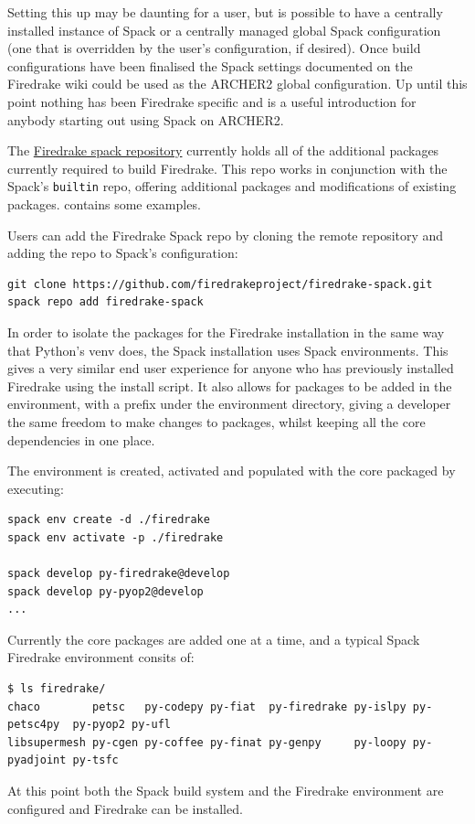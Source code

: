\documentclass[a4paper,11pt]{article}
\begin{document}
Setting this up may be daunting for a user, but is possible to have a centrally installed instance of Spack or a centrally managed global Spack configuration (one that is overridden by the user's configuration, if desired).
Once build configurations have been finalised the Spack settings documented on the Firedrake wiki\cite{firedrakewiki} could be used as the ARCHER2 global configuration.
Up until this point nothing has been Firedrake specific and is a useful introduction for anybody starting out using Spack on ARCHER2.

The \href{https://github.com/firedrakeproject/firedrake-spack}{Firedrake spack repository} currently holds all of the additional packages currently required to build Firedrake.
This repo works in conjunction with the Spack's \verb`builtin` repo, offering additional packages and modifications of existing packages.
 contains some examples.

Users can add the Firedrake Spack repo by cloning the remote repository and adding the repo to Spack's configuration:
\begin{lstlisting}
git clone https://github.com/firedrakeproject/firedrake-spack.git
spack repo add firedrake-spack
\end{lstlisting}

In order to isolate the packages for the Firedrake installation in the same way that Python's venv does, the Spack installation uses Spack environments.
This gives a very similar end user experience for anyone who has previously installed Firedrake using the install script.
It also allows for packages to be added in the environment, with a prefix under the environment directory, giving a developer the same freedom to make changes to packages, whilst keeping all the core dependencies in one place.

The environment is created, activated and populated with the core packaged by executing:
\begin{lstlisting}
spack env create -d ./firedrake
spack env activate -p ./firedrake

spack develop py-firedrake@develop
spack develop py-pyop2@develop
...
\end{lstlisting}

Currently the core packages are added one at a time, and a typical Spack Firedrake environment consits of:
\begin{lstlisting}
$ ls firedrake/
chaco        petsc   py-codepy py-fiat  py-firedrake py-islpy py-petsc4py  py-pyop2 py-ufl
libsupermesh py-cgen py-coffee py-finat py-genpy     py-loopy py-pyadjoint py-tsfc
\end{lstlisting}
At this point both the Spack build system and the Firedrake environment are configured and Firedrake can be installed.
\end{document}
